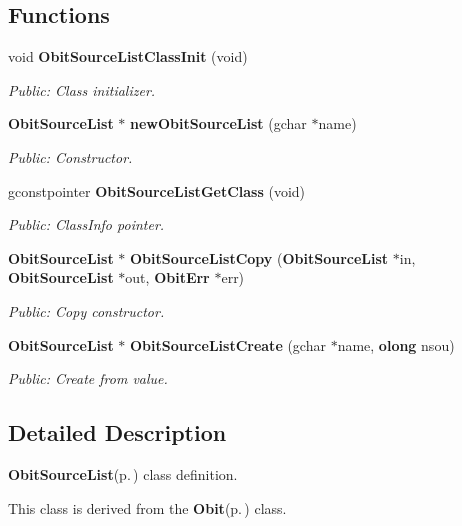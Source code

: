 \subsection*{Functions}
\begin{CompactItemize}
\item 
void {\bf Obit\-Source\-List\-Class\-Init} (void)
\begin{CompactList}\small\item\em Public: Class initializer. \item\end{CompactList}\item 
{\bf Obit\-Source\-List} $\ast$ {\bf new\-Obit\-Source\-List} (gchar $\ast$name)
\begin{CompactList}\small\item\em Public: Constructor. \item\end{CompactList}\item 
gconstpointer {\bf Obit\-Source\-List\-Get\-Class} (void)
\begin{CompactList}\small\item\em Public: Class\-Info pointer. \item\end{CompactList}\item 
{\bf Obit\-Source\-List} $\ast$ {\bf Obit\-Source\-List\-Copy} ({\bf Obit\-Source\-List} $\ast$in, {\bf Obit\-Source\-List} $\ast$out, {\bf Obit\-Err} $\ast$err)
\begin{CompactList}\small\item\em Public: Copy constructor. \item\end{CompactList}\item 
{\bf Obit\-Source\-List} $\ast$ {\bf Obit\-Source\-List\-Create} (gchar $\ast$name, {\bf olong} nsou)
\begin{CompactList}\small\item\em Public: Create from value. \item\end{CompactList}\end{CompactItemize}


\subsection{Detailed Description}
{\bf Obit\-Source\-List}{\rm (p.\,\pageref{structObitSourceList})} class definition. 

This class is derived from the {\bf Obit}{\rm (p.\,\pageref{structObit})} class.

